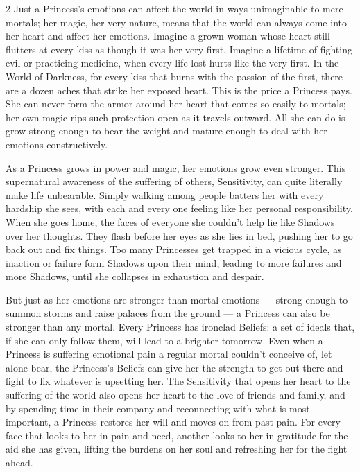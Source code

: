 \begin{multicols}{2}
Just a Princess's emotions can affect the world in ways unimaginable to mere mortals; her magic, her very nature, means that the world can always come into her heart and affect her emotions. Imagine a grown woman whose heart still flutters at every kiss as though it was her very first. Imagine a lifetime of fighting evil or practicing medicine, when every life lost hurts like the very first. In the World of Darkness, for every kiss that burns with the passion of the first, there are a dozen aches that strike her exposed heart. This is the price a Princess pays. She can never form the armor around her heart that comes so easily to mortals; her own magic rips such protection open as it travels outward. All she can do is grow strong enough to bear the weight and mature enough to deal with her emotions constructively. 

As a Princess grows in power and magic, her emotions grow even stronger. This supernatural awareness of the suffering of others, Sensitivity, can quite literally make life unbearable. Simply walking among people batters her with every hardship she sees, with each and every one feeling like her personal responsibility. When she goes home, the faces of everyone she couldn't help lie like Shadows over her thoughts. They flash before her eyes as she lies in bed, pushing her to go back out and fix things. Too many Princesses get trapped in a vicious cycle, as inaction or failure form Shadows upon their mind, leading to more failures and more Shadows, until she collapses in exhaustion and despair. 

But just as her emotions are stronger than mortal emotions — strong enough to summon storms and raise palaces from the ground — a Princess can also be stronger than any mortal. Every Princess has ironclad Beliefs: a set of ideals that, if she can only follow them, will lead to a brighter tomorrow. Even when a Princess is suffering emotional pain a regular mortal couldn't conceive of, let alone bear, the Princess's Beliefs can give her the strength to get out there and fight to fix whatever is upsetting her. The Sensitivity that opens her heart to the suffering of the world also opens her heart to the love of friends and family, and by spending time in their company and reconnecting with what is most important, a Princess restores her will and moves on from past pain. For every face that looks to her in pain and need, another looks to her in gratitude for the aid she has given, lifting the burdens on her soul and refreshing her for the fight ahead. 


\end{multicols}
